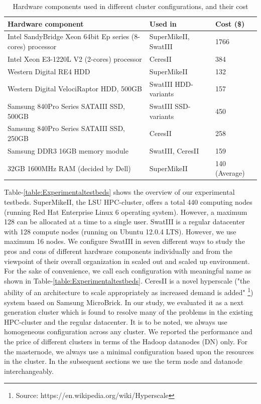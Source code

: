 \documentclass[conference]{IEEEtran}
\begin{document}
\begin{table}
	\begin{tabular}{ |p{4.4cm} |p{1.6cm} |p{1.6cm} |} \hline
		Hardware component & Used in & Cost (\$)\\ \hline
		Intel SandyBridge Xeon 64bit Ep series (8-cores) processor & SuperMikeII, SwatIII & 1766\\ \hline
		Intel Xeon E3-1220L V2 (2-cores) processor& CeresII & 384\\ \hline
		Western Digital RE4 HDD & SuperMikeII & 132\\ \hline
		Western Digital VelociRaptor HDD, 500GB & SwatIII HDD-variants & 157 \\ \hline
		Samsung 840Pro Series SATAIII SSD, 500GB & SwatIII SSD-variants & 450\\ \hline
		Samsung 840Pro Series SATAIII SSD, 250GB & CeresII & 258\\ \hline
		Samsung DDR3 16GB memory module & SwatIII, CeresII & 159\\ \hline
		32GB 1600MHz RAM (decided by Dell) & SuperMikeII  & 140 (Average)\\ \hline
	\end{tabular}
	\caption{Hardware components used in different cluster configurations, and their cost}
	\label{table:PriceOfEachComponent}
\vspace{-2.3em}
\end{table}
Table-\ref{table:Experimentaltestbeds} shows the overview of our experimental testbeds. 
SuperMikeII, the LSU HPC-cluster, offers a total 440 computing nodes (running Red Hat Enterprise Linux 6 operating system). However, a maximum 128 can be allocated at a time to a single user. 
SwatIII is a regular datacenter with 128 compute nodes (running on Ubuntu 12.0.4 LTS). However, we use maximum 16 nodes. We configure SwatIII in seven different ways to study the pros and cons of different hardware components individually and from the viewpoint of their overall organization in scaled out and scaled up environment. For the sake of convenience, we call each configuration with meaningful name as shown in Table-\ref{table:Experimentaltestbeds}. 
CeresII is a novel hyperscale ("the ability of an architecture to scale appropriately as increased demand is added" \footnote{Source: https://en.wikipedia.org/wiki/Hyperscale}) system based on Samsung MicroBrick. In our study, we evaluated it as a next generation cluster which is found to resolve many of the problems in the existing HPC-cluster and the regular datacenter. 
It is to be noted, we always use homogeneous configuration across any cluster. We reported the performance and the price of different clusters in terms of the Hadoop datanodes (DN) only. For the masternode, we always use a minimal configuration based upon the resources in the cluster. In the subsequent sections we use the term node and datanode interchangeably.
\end{document}
